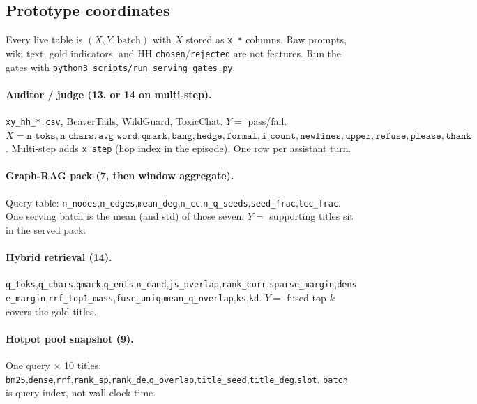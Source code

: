 \subsection{Prototype coordinates}
\label{sec:serving-features}
Every live table is \((X,Y,\mathrm{batch})\) with \(X\) stored as \texttt{x\_*} columns.
Raw prompts, wiki text, gold indicators, and HH \texttt{chosen}/\texttt{rejected} are not features.
Run the gates with \texttt{python3 scripts/run\_serving\_gates.py}.

\paragraph{Auditor / judge (13, or 14 on multi-step).}
\texttt{xy\_hh\_*.csv}, BeaverTails, WildGuard, ToxicChat.
\(Y=\) pass/fail.
\(X=\texttt{n\_toks},\texttt{n\_chars},\texttt{avg\_word},\texttt{qmark},\texttt{bang},\texttt{hedge},\texttt{formal},\texttt{i\_count},\texttt{newlines},\texttt{upper},\texttt{refuse},\texttt{please},\texttt{thank}\).
Multi-step adds \texttt{x\_step} (hop index in the episode). One row per assistant turn.

\paragraph{Graph-RAG pack (7, then window aggregate).}
Query table: \texttt{n\_nodes},\texttt{n\_edges},\texttt{mean\_deg},\texttt{n\_cc},\texttt{n\_q\_seeds},\texttt{seed\_frac},\texttt{lcc\_frac}.
One serving batch is the mean (and std) of those seven.
\(Y=\) supporting titles sit in the served pack.

\paragraph{Hybrid retrieval (14).}
\texttt{q\_toks},\texttt{q\_chars},\texttt{qmark},\texttt{q\_ents},\texttt{n\_cand},\texttt{js\_overlap},\texttt{rank\_corr},\texttt{sparse\_margin},\texttt{dense\_margin},\texttt{rrf\_top1\_mass},\texttt{fuse\_uniq},\texttt{mean\_q\_overlap},\texttt{ks},\texttt{kd}.
\(Y=\) fused top-\(k\) covers the gold titles.

\paragraph{Hotpot pool snapshot (9).}
One query \(\times\) 10 titles: \texttt{bm25},\texttt{dense},\texttt{rrf},\texttt{rank\_sp},\texttt{rank\_de},\texttt{q\_overlap},\texttt{title\_seed},\texttt{title\_deg},\texttt{slot}.
\texttt{batch} is query index, not wall-clock time.

